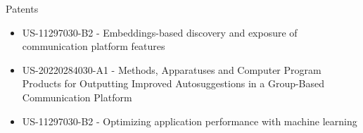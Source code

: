 \documentclass{resume} %
\begin{document}
\begin{rSection}{Patents}
\begin{itemize}
	\item US-11297030-B2 -  Embeddings-based discovery and exposure of communication platform features
	\item US-20220284030-A1 - Methods, Apparatuses and Computer Program Products for Outputting Improved Autosuggestions in a Group-Based Communication Platform
	\item US-11297030-B2 - Optimizing application performance with machine learning
\end{itemize}
\end{rSection}










\end{document}
